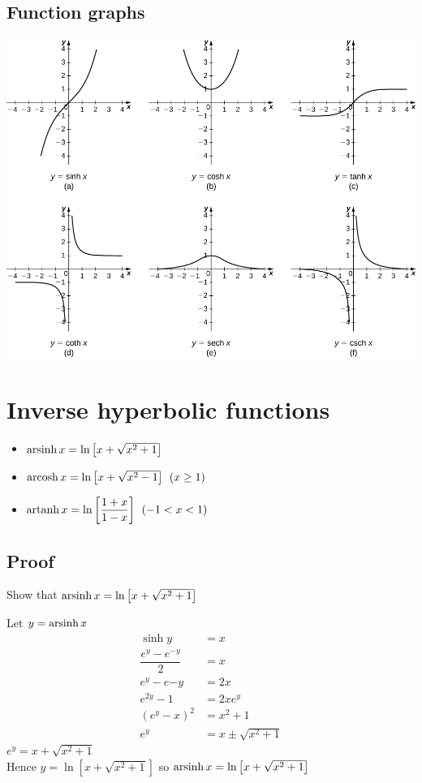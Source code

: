 \subsection{Function graphs}
\includegraphics[width=\linewidth]{images/hyperbolic_graphs}

\section{Inverse hyperbolic functions}
\begin{itemize}
	\item $\operatorname{arsinh} x = \ln \left[x+\sqrt{x^2+1}\right]$
	\item $\operatorname{arcosh} x = \ln \left[x+\sqrt{x^2-1}\right] \:\: (x \geq 1)$
	\item $\operatorname{artanh} x = \ln \left[\dfrac{1+x}{1-x}\right] \:\: (-1 < x < 1)$
\end{itemize}

\subsection{Proof}
\begin{example}
	Show that $\operatorname{arsinh} x = \ln \left[x+\sqrt{x^2+1}\right]$
\end{example}

\begin{solution}
	Let $y=\operatorname{arsinh} x$
	\begin{align*}
		\sinh y &= x\\
		\dfrac{e^y-e^{-y}}{2} &= x\\
		e^y-e{-y} &= 2x\\
		e^{2y} - 1 &= 2x e^y\\
		(e^y-x)^2 &= x^2 + 1\\
		e^y &= x \pm \sqrt{x^2 + 1}
	\end{align*}
	$e^y = x + \sqrt{x^2 + 1}$ \\
	Hence $y = \ln \left[x+\sqrt{x^2+1}\right]$ so $\operatorname{arsinh} x = \ln \left[x+\sqrt{x^2+1}\right]$
\end{solution}

